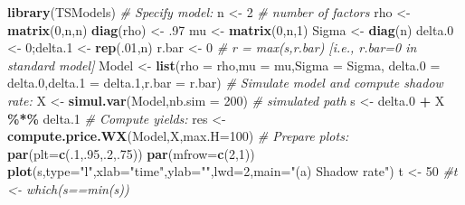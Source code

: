 \documentclass[
  12pt,
]{book}
\newenvironment{Shaded}{\begin{snugshade}}{\end{snugshade}}
\newcommand{\AttributeTok}[1]{\textcolor[rgb]{0.13,0.29,0.53}{#1}}
\newcommand{\CommentTok}[1]{\textcolor[rgb]{0.56,0.35,0.01}{\textit{#1}}}
\newcommand{\DecValTok}[1]{\textcolor[rgb]{0.00,0.00,0.81}{#1}}
\newcommand{\FloatTok}[1]{\textcolor[rgb]{0.00,0.00,0.81}{#1}}
\newcommand{\FunctionTok}[1]{\textcolor[rgb]{0.13,0.29,0.53}{\textbf{#1}}}
\newcommand{\NormalTok}[1]{#1}
\newcommand{\OtherTok}[1]{\textcolor[rgb]{0.56,0.35,0.01}{#1}}
\newcommand{\SpecialCharTok}[1]{\textcolor[rgb]{0.81,0.36,0.00}{\textbf{#1}}}
\newcommand{\StringTok}[1]{\textcolor[rgb]{0.31,0.60,0.02}{#1}}
\theoremstyle{definition}
\theoremstyle{definition}
\theoremstyle{definition}
\theoremstyle{definition}
\theoremstyle{remark}
\begin{document}
\begin{Shaded}
\begin{Highlighting}[]
\FunctionTok{library}\NormalTok{(TSModels)}
\CommentTok{\# Specify model:}
\NormalTok{n }\OtherTok{\textless{}{-}} \DecValTok{2} \CommentTok{\# number of factors}
\NormalTok{rho }\OtherTok{\textless{}{-}} \FunctionTok{matrix}\NormalTok{(}\DecValTok{0}\NormalTok{,n,n)}
\FunctionTok{diag}\NormalTok{(rho) }\OtherTok{\textless{}{-}}\NormalTok{ .}\DecValTok{97}
\NormalTok{mu }\OtherTok{\textless{}{-}} \FunctionTok{matrix}\NormalTok{(}\DecValTok{0}\NormalTok{,n,}\DecValTok{1}\NormalTok{)}
\NormalTok{Sigma }\OtherTok{\textless{}{-}} \FunctionTok{diag}\NormalTok{(n)}
\NormalTok{delta}\FloatTok{.0} \OtherTok{\textless{}{-}} \DecValTok{0}\NormalTok{;delta}\FloatTok{.1} \OtherTok{\textless{}{-}} \FunctionTok{rep}\NormalTok{(.}\DecValTok{01}\NormalTok{,n)}
\NormalTok{r.bar }\OtherTok{\textless{}{-}} \DecValTok{0} \CommentTok{\# r = max(s,r.bar) [i.e., r.bar=0 in standard model]}
\NormalTok{Model }\OtherTok{\textless{}{-}} \FunctionTok{list}\NormalTok{(}\AttributeTok{rho =}\NormalTok{ rho,}\AttributeTok{mu =}\NormalTok{ mu,}\AttributeTok{Sigma =}\NormalTok{ Sigma,}
  \AttributeTok{delta.0 =}\NormalTok{ delta}\FloatTok{.0}\NormalTok{,}\AttributeTok{delta.1 =}\NormalTok{ delta}\FloatTok{.1}\NormalTok{,}\AttributeTok{r.bar =}\NormalTok{ r.bar)}
\CommentTok{\# Simulate model and compute shadow rate:}
\NormalTok{X }\OtherTok{\textless{}{-}} \FunctionTok{simul.var}\NormalTok{(Model,}\AttributeTok{nb.sim =} \DecValTok{200}\NormalTok{) }\CommentTok{\# simulated path}
\NormalTok{s }\OtherTok{\textless{}{-}}\NormalTok{ delta}\FloatTok{.0} \SpecialCharTok{+}\NormalTok{ X }\SpecialCharTok{\%*\%}\NormalTok{ delta}\FloatTok{.1}
\CommentTok{\# Compute yields:}
\NormalTok{res }\OtherTok{\textless{}{-}} \FunctionTok{compute.price.WX}\NormalTok{(Model,X,}\AttributeTok{max.H=}\DecValTok{100}\NormalTok{)}
\CommentTok{\# Prepare plots:}
\FunctionTok{par}\NormalTok{(}\AttributeTok{plt=}\FunctionTok{c}\NormalTok{(.}\DecValTok{1}\NormalTok{,.}\DecValTok{95}\NormalTok{,.}\DecValTok{2}\NormalTok{,.}\DecValTok{75}\NormalTok{))}
\FunctionTok{par}\NormalTok{(}\AttributeTok{mfrow=}\FunctionTok{c}\NormalTok{(}\DecValTok{2}\NormalTok{,}\DecValTok{1}\NormalTok{))}
\FunctionTok{plot}\NormalTok{(s,}\AttributeTok{type=}\StringTok{"l"}\NormalTok{,}\AttributeTok{xlab=}\StringTok{"time"}\NormalTok{,}\AttributeTok{ylab=}\StringTok{""}\NormalTok{,}\AttributeTok{lwd=}\DecValTok{2}\NormalTok{,}\AttributeTok{main=}\StringTok{"(a) Shadow rate"}\NormalTok{)}
\NormalTok{t }\OtherTok{\textless{}{-}} \DecValTok{50} \CommentTok{\#t \textless{}{-} which(s==min(s))}

\end{Highlighting}
\end{Shaded}
\end{document}
